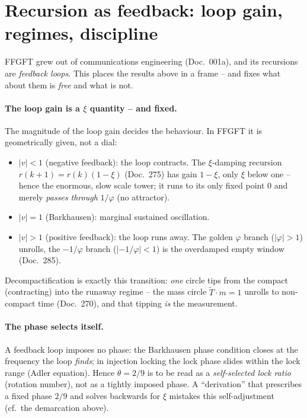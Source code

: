 \section{Recursion as feedback: loop gain, regimes, discipline}
FFGFT grew out of communications engineering (Doc.~001a), and its recursions are \emph{feedback loops}.
This places the results above in a frame -- and fixes what about them is \emph{free} and what is not.

\paragraph{The loop gain is a $\xi$ quantity -- and fixed.} The magnitude of the loop gain decides the
behaviour. In FFGFT it is geometrically given, not a dial:
\begin{itemize}
\item $|v|<1$ (negative feedback): the loop contracts. The $\xi$-damping recursion
$r(k{+}1)=r(k)(1-\xi)$ (Doc.~275) has gain $1-\xi$, only $\xi$ below one -- hence the enormous, slow
scale tower; it runs to its only fixed point $0$ and merely \emph{passes through} $1/\varphi$ (no
attractor).
\item $|v|=1$ (Barkhausen): marginal sustained oscillation.
\item $|v|>1$ (positive feedback): the loop runs away. The golden $\varphi$ branch ($|\varphi|>1$)
unrolls, the $-1/\varphi$ branch ($|-1/\varphi|<1$) is the overdamped empty window (Doc.~285).
\end{itemize}
Decompactification is exactly this transition: \emph{one} circle tips from the compact (contracting)
into the runaway regime -- the mass circle $\tilde T\cdot m=1$ unrolls to non-compact time (Doc.~270),
and that tipping \emph{is} the measurement.

\paragraph{The phase selects itself.} A feedback loop imposes no phase: the Barkhausen phase condition
closes at the frequency the loop \emph{finds}; in injection locking the lock phase slides within the
lock range (Adler equation). Hence $\theta=2/9$ is to be read as a \emph{self-selected lock ratio}
(rotation number), not as a tightly imposed phase. A \enquote{derivation} that prescribes a fixed phase
$2/9$ and solves backwards for $\xi$ mistakes this self-adjustment (cf.\ the demarcation above).


